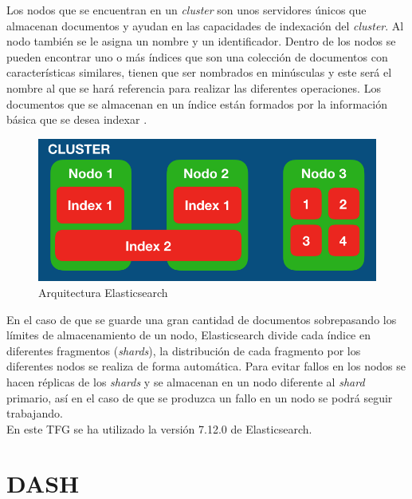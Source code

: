 Los nodos que se encuentran en un \textit{cluster} son unos servidores únicos que almacenan documentos y ayudan en las capacidades de indexación del \textit{cluster}. Al nodo también se le asigna un nombre y un identificador. Dentro de los nodos se pueden encontrar uno o más índices que son una colección de documentos con características similares, tienen que ser nombrados en minúsculas y este será el nombre al que se hará referencia para realizar las diferentes operaciones. Los documentos que se almacenan en un índice están formados por la información básica que se desea indexar \cite{elastic3}.\\



\begin{figure}[H]
    \centering
    \includegraphics[width=12cm, keepaspectratio]{img/arquitectura_elastic.png}
    \caption{Arquitectura Elasticsearch}
    \label{fig:elastic}
\end{figure}
En el caso de que se guarde una gran cantidad de documentos sobrepasando los límites de almacenamiento de un nodo, Elasticsearch divide cada índice en diferentes fragmentos (\textit{shards}), la distribución de cada fragmento por los diferentes nodos se realiza de forma automática. Para evitar fallos en los nodos se hacen réplicas de los \textit{shards} y se almacenan en un nodo diferente al \textit{shard} primario, así en el caso de que se produzca un fallo en un nodo se podrá seguir trabajando.\\

En este TFG se ha utilizado la versión 7.12.0 de Elasticsearch.


\section{DASH}

